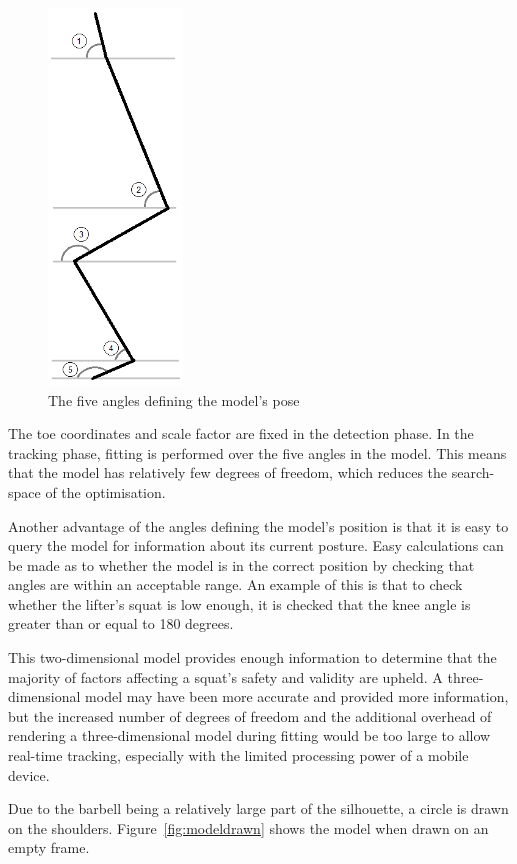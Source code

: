\begin{figure}[H]
    \centering
	\includegraphics[height=10cm]{algorithm/images/model_angles}
\caption{The five angles defining the model's pose}
\label{fig:modelangles}
\end{figure}

The toe coordinates and scale factor are fixed in the detection phase. In the tracking phase, fitting is performed over the five angles in the model. This means that the model has relatively few degrees of freedom, which reduces the search-space of the optimisation.

Another advantage of the angles defining the model's position is that it is easy to query the model for information about its current posture. Easy calculations can be made as to whether the model is in the correct position by checking that angles are within an acceptable range. An example of this is that to check whether the lifter's squat is low enough, it is checked that the knee angle is greater than or equal to 180 degrees.

This two-dimensional model provides enough information to determine that the majority of factors affecting a squat's safety and validity are upheld. A three-dimensional model may have been more accurate and provided more information, but the increased number of degrees of freedom and the additional overhead of rendering a three-dimensional model during fitting would be too large to allow real-time tracking, especially with the limited processing power of a mobile device.

Due to the barbell being a relatively large part of the silhouette, a circle is drawn on the shoulders. Figure~\ref{fig:modeldrawn} shows the model when drawn on an empty frame.

